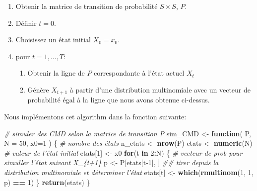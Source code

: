\documentclass[
]{book}
\newenvironment{Shaded}{\begin{snugshade}}{\end{snugshade}}
\newcommand{\CommentTok}[1]{\textcolor[rgb]{0.56,0.35,0.01}{\textit{#1}}}
\newcommand{\ControlFlowTok}[1]{\textcolor[rgb]{0.13,0.29,0.53}{\textbf{#1}}}
\newcommand{\DataTypeTok}[1]{\textcolor[rgb]{0.13,0.29,0.53}{#1}}
\newcommand{\DecValTok}[1]{\textcolor[rgb]{0.00,0.00,0.81}{#1}}
\newcommand{\KeywordTok}[1]{\textcolor[rgb]{0.13,0.29,0.53}{\textbf{#1}}}
\newcommand{\NormalTok}[1]{#1}
\newcommand{\OperatorTok}[1]{\textcolor[rgb]{0.81,0.36,0.00}{\textbf{#1}}}
\newcommand{\StringTok}[1]{\textcolor[rgb]{0.31,0.60,0.02}{#1}}
\providecommand{\tightlist}{%
  \setlength{\itemsep}{0pt}\setlength{\parskip}{0pt}}
\theoremstyle{definition}
\theoremstyle{definition}
\theoremstyle{definition}
\theoremstyle{remark}
\begin{document}
\begin{enumerate}
\def\labelenumi{\arabic{enumi}.}
\tightlist
\item
  Obtenir la matrice de transition de probabilité \(S\times S\), \(P\).
\item
  Définir \(t=0\).
\item
  Choisissez un état initial \(X_0 = x_0\).
\item
  pour \(t=1, \ldots , T\):

  \begin{enumerate}
  \def\labelenumii{\alph{enumii})}
  \tightlist
  \item
    Obtenir la ligne de \(P\) correspondante à l'état actuel \(X_t\)
  \item
    Génère \(X_{t + 1}\) à partir d'une distribution multinomiale avec un vecteur de probabilité égal à la ligne que nous avons obtenue ci-dessus.
  \end{enumerate}
\end{enumerate}

Nous implémentons cet algorithm dans la fonction suivante:

\begin{Shaded}
\begin{Highlighting}[]
\CommentTok{# simuler des CMD selon la matrice de transition P}
\NormalTok{sim_CMD <-}\StringTok{ }\ControlFlowTok{function}\NormalTok{( P, }\DataTypeTok{N =} \DecValTok{50}\NormalTok{, }\DataTypeTok{x0=}\DecValTok{1}\NormalTok{ ) \{}
  \CommentTok{# nombre des états}
\NormalTok{  n_etats <-}\StringTok{ }\KeywordTok{nrow}\NormalTok{(P)}
\NormalTok{  etats <-}\StringTok{ }\KeywordTok{numeric}\NormalTok{(N)}
  \CommentTok{# valeur de l'état initial }
\NormalTok{  etats[}\DecValTok{1}\NormalTok{] <-}\StringTok{ }\NormalTok{x0}
  \ControlFlowTok{for}\NormalTok{(t }\ControlFlowTok{in} \DecValTok{2}\OperatorTok{:}\NormalTok{N) \{}
    \CommentTok{# vecteur de prob pour simuller l'état suivant X_\{t+1\}}
\NormalTok{    p <-}\StringTok{ }\NormalTok{P[etats[t}\DecValTok{-1}\NormalTok{], ]}
    \CommentTok{## tirer depuis la distribution multinomiale et déterminer l'état}
\NormalTok{    etats[t] <-}\StringTok{ }\KeywordTok{which}\NormalTok{(}\KeywordTok{rmultinom}\NormalTok{(}\DecValTok{1}\NormalTok{, }\DecValTok{1}\NormalTok{, p) }\OperatorTok{==}\StringTok{ }\DecValTok{1}\NormalTok{)}
\NormalTok{  \}}
  \KeywordTok{return}\NormalTok{(etats)}
\NormalTok{\}}
\end{Highlighting}
\end{Shaded}
\end{document}
